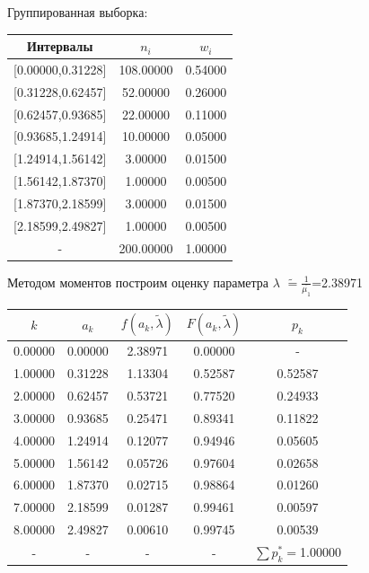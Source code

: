 \newpage%
Группированная выборка:\newline%
\newline%
%
\begin{tabular}{|c|c|c|}%
\hline%
Интервалы&$n_i$&$w_i$\\%
\hline%
{[}0.00000,0.31228{]}&108.00000&0.54000\\%
\hline%
{[}0.31228,0.62457{]}&52.00000&0.26000\\%
\hline%
{[}0.62457,0.93685{]}&22.00000&0.11000\\%
\hline%
{[}0.93685,1.24914{]}&10.00000&0.05000\\%
\hline%
{[}1.24914,1.56142{]}&3.00000&0.01500\\%
\hline%
{[}1.56142,1.87370{]}&1.00000&0.00500\\%
\hline%
{[}1.87370,2.18599{]}&3.00000&0.01500\\%
\hline%
{[}2.18599,2.49827{]}&1.00000&0.00500\\%
\hline%
{-}&200.00000&1.00000\\%
\hline%
\end{tabular}%
\newline%
\newline%
%
Методом моментов построим оценку параметра $\lambda$%
$\widetilde = \frac{1}{\overline{\mu_1}}$=2.38971%
\newpage%
\begin{tabular}{|c|c|c|c|c|}%
\hline%
$k$&$a_k$&$f(a_k, \widetilde{\lambda})$&$F(a_k, \widetilde{\lambda})$&$p_k$\\%
\hline%
0.00000&0.00000&2.38971&0.00000&{-}\\%
\hline%
1.00000&0.31228&1.13304&0.52587&0.52587\\%
\hline%
2.00000&0.62457&0.53721&0.77520&0.24933\\%
\hline%
3.00000&0.93685&0.25471&0.89341&0.11822\\%
\hline%
4.00000&1.24914&0.12077&0.94946&0.05605\\%
\hline%
5.00000&1.56142&0.05726&0.97604&0.02658\\%
\hline%
6.00000&1.87370&0.02715&0.98864&0.01260\\%
\hline%
7.00000&2.18599&0.01287&0.99461&0.00597\\%
\hline%
8.00000&2.49827&0.00610&0.99745&0.00539\\%
\hline%
{-}&{-}&{-}&{-}&$\sum p_{k}^*=$1.00000\\%
\hline%
\end{tabular}%
\newline%
\newline%
%


